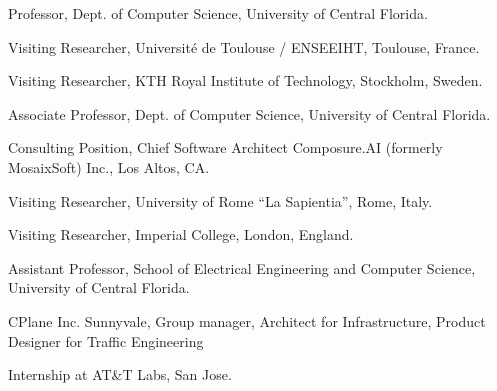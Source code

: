 
 Professor, Dept. of Computer Science, University of Central Florida.

 Visiting Researcher, Universit{\'e} de Toulouse / ENSEEIHT, Toulouse, France.

 Visiting Researcher, KTH Royal Institute of Technology, Stockholm, Sweden.

 Associate Professor, Dept. of Computer Science, University of Central Florida.

 Consulting Position, Chief Software Architect Composure.AI (formerly MosaixSoft) Inc., Los Altos, CA.

 Visiting Researcher, University of Rome ``La Sapientia'', Rome, Italy.

 Visiting Researcher, Imperial College, London, England.

 Assistant Professor, School of Electrical Engineering and Computer Science, University of Central Florida.

 CPlane Inc. Sunnyvale, Group manager, Architect for
Infrastructure, Product Designer for Traffic Engineering





 Internship at AT\&T Labs, San Jose.


